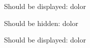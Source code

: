 


{}

Should be displayed:  dolor

\clozehide

Should be hidden:  dolor

\clozeshow

Should be displayed:  dolor

\bye
